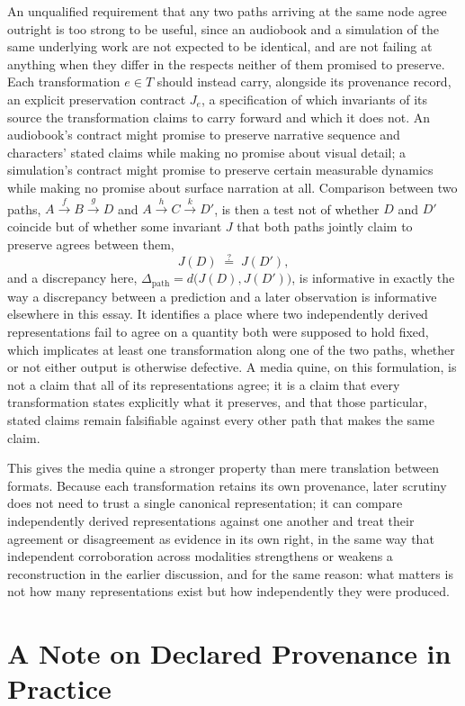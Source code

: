 \documentclass[11pt]{article}
\begin{document}
An unqualified requirement that any two paths arriving at the same node agree outright is too strong to be useful, since an audiobook and a simulation of the same underlying work are not expected to be identical, and are not failing at anything when they differ in the respects neither of them promised to preserve. Each transformation $e \in T$ should instead carry, alongside its provenance record, an explicit preservation contract $J_e$, a specification of which invariants of its source the transformation claims to carry forward and which it does not. An audiobook's contract might promise to preserve narrative sequence and characters' stated claims while making no promise about visual detail; a simulation's contract might promise to preserve certain measurable dynamics while making no promise about surface narration at all. Comparison between two paths, $A \xrightarrow{f} B \xrightarrow{g} D$ and $A \xrightarrow{h} C \xrightarrow{k} D'$, is then a test not of whether $D$ and $D'$ coincide but of whether some invariant $J$ that both paths jointly claim to preserve agrees between them,
\[
J(D) \;\stackrel{?}{=}\; J(D'),
\]
and a discrepancy here, $\Delta_{\text{path}} = d\bigl(J(D), J(D')\bigr)$, is informative in exactly the way a discrepancy between a prediction and a later observation is informative elsewhere in this essay. It identifies a place where two independently derived representations fail to agree on a quantity both were supposed to hold fixed, which implicates at least one transformation along one of the two paths, whether or not either output is otherwise defective. A media quine, on this formulation, is not a claim that all of its representations agree; it is a claim that every transformation states explicitly what it preserves, and that those particular, stated claims remain falsifiable against every other path that makes the same claim.

This gives the media quine a stronger property than mere translation between formats. Because each transformation retains its own provenance, later scrutiny does not need to trust a single canonical representation; it can compare independently derived representations against one another and treat their agreement or disagreement as evidence in its own right, in the same way that independent corroboration across modalities strengthens or weakens a reconstruction in the earlier discussion, and for the same reason: what matters is not how many representations exist but how independently they were produced.

\section{A Note on Declared Provenance in Practice}
\end{document}
